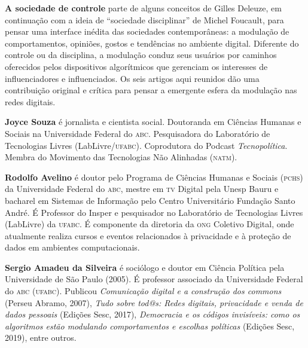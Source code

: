 \textbf{A sociedade de controle} parte de alguns conceitos de Gilles Deleuze, em continuação com a ideia de ``sociedade disciplinar'' de Michel Foucault, para pensar uma interface inédita das sociedades contemporâneas: a modulação de comportamentos, opiniões, gostos e tendências no ambiente digital. Diferente do controle ou da disciplina, a modulação conduz seus usuários por caminhos oferecidos pelos dispositivos algorítmicos que gerenciam os
interesses de influenciadores e influenciados. Os seis artigos aqui reunidos dão uma contribuição original e crítica para pensar a emergente esfera da modulação nas redes digitais.

\textbf{Joyce Souza} é jornalista e cientista social. Doutoranda em Ciências Humanas e Sociais na Universidade Federal do \textsc{abc}. Pesquisadora do Laboratório de Tecnologias Livres (LabLivre/\textsc{ufabc}). Coprodutora do Podcast \textit{Tecnopolítica}. Membra do Movimento das Tecnologias Não Alinhadas (\textsc{natm}). 

\textbf{Rodolfo Avelino} é doutor pelo Programa de Ciências Humanas e Sociais (\textsc{pchs}) da Universidade Federal do \textsc{abc}, mestre em \textsc{tv} Digital pela Unesp Bauru e bacharel em Sistemas de Informação pelo Centro Universitário Fundação Santo André. É Professor do Insper e pesquisador no Laboratório de Tecnologias Livres (LabLivre) da \textsc{ufabc}. É componente da diretoria da \textsc{ong} Coletivo Digital, onde atualmente realiza cursos e eventos relacionados à privacidade e à proteção de dados em ambientes computacionais.

\textbf{Sergio Amadeu da Silveira} é sociólogo e doutor em Ciência Política pela Universidade de São Paulo (2005). É professor associado da Universidade Federal do \textsc{abc} (\textsc{ufabc}). Publicou \textit{Comunicação digital e a construção dos commons} (Perseu Abramo, 2007), \textit{Tudo sobre tod@s: Redes digitais, privacidade e venda de dados pessoais} (Edições Sesc, 2017), \textit{Democracia e os códigos invisíveis: como os algoritmos estão modulando comportamentos e escolhas políticas} (Edições Sesc, 2019), entre outros.

